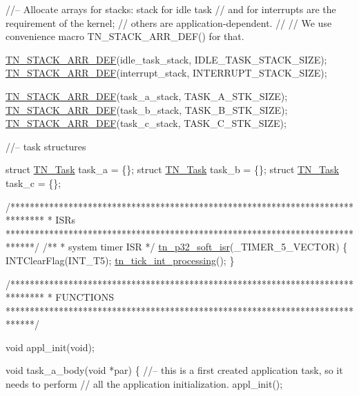 \begin{DoxyCodeInclude}
\textcolor{comment}{//-- Allocate arrays for stacks: stack for idle task}
\textcolor{comment}{//   and for interrupts are the requirement of the kernel;}
\textcolor{comment}{//   others are application-dependent.}
\textcolor{comment}{//}
\textcolor{comment}{//   We use convenience macro TN\_STACK\_ARR\_DEF() for that.}

\hyperlink{tn__sys_8h_ad61af0f0e9ab96bdf1ac1bf1e03e3c75}{TN\_STACK\_ARR\_DEF}(idle\_task\_stack, IDLE\_TASK\_STACK\_SIZE);
\hyperlink{tn__sys_8h_ad61af0f0e9ab96bdf1ac1bf1e03e3c75}{TN\_STACK\_ARR\_DEF}(interrupt\_stack, INTERRUPT\_STACK\_SIZE);

\hyperlink{tn__sys_8h_ad61af0f0e9ab96bdf1ac1bf1e03e3c75}{TN\_STACK\_ARR\_DEF}(task\_a\_stack, TASK\_A\_STK\_SIZE);
\hyperlink{tn__sys_8h_ad61af0f0e9ab96bdf1ac1bf1e03e3c75}{TN\_STACK\_ARR\_DEF}(task\_b\_stack, TASK\_B\_STK\_SIZE);
\hyperlink{tn__sys_8h_ad61af0f0e9ab96bdf1ac1bf1e03e3c75}{TN\_STACK\_ARR\_DEF}(task\_c\_stack, TASK\_C\_STK\_SIZE);



\textcolor{comment}{//-- task structures}

\textcolor{keyword}{struct }\hyperlink{structTN__Task}{TN\_Task} task\_a = \{\};
\textcolor{keyword}{struct }\hyperlink{structTN__Task}{TN\_Task} task\_b = \{\};
\textcolor{keyword}{struct }\hyperlink{structTN__Task}{TN\_Task} task\_c = \{\};



\textcolor{comment}{/*******************************************************************************}
\textcolor{comment}{ *    ISRs}
\textcolor{comment}{ ******************************************************************************/}
\textcolor{comment}{}
\textcolor{comment}{/**}
\textcolor{comment}{ * system timer ISR}
\textcolor{comment}{ */}
\hyperlink{tn__arch__pic32_8h_a02d853d8d573f928fb8da65ef0c2bc8e}{tn\_p32\_soft\_isr}(\_TIMER\_5\_VECTOR)
\{
   INTClearFlag(INT\_T5);
   \hyperlink{tn__sys_8h_a944d96c7a5d442d271115b6cb22a085b}{tn\_tick\_int\_processing}();
\}



\textcolor{comment}{/*******************************************************************************}
\textcolor{comment}{ *    FUNCTIONS}
\textcolor{comment}{ ******************************************************************************/}

\textcolor{keywordtype}{void} appl\_init(\textcolor{keywordtype}{void});

\textcolor{keywordtype}{void} task\_a\_body(\textcolor{keywordtype}{void} *par)
\{
   \textcolor{comment}{//-- this is a first created application task, so it needs to perform}
   \textcolor{comment}{//   all the application initialization.}
   appl\_init();


\end{DoxyCodeInclude}
